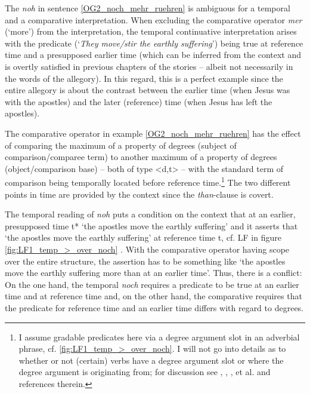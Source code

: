 \documentclass[output=paper,
modfonts
]{langscibook}
\begin{document}
The \textit{noh} in sentence \ref{OG2_noch_mehr_ruehren} is ambiguous for a temporal and a comparative interpretation. When excluding the comparative operator \textit{mer} (`more') from the interpretation, the temporal continuative interpretation arises with the predicate (`\textit{They move/stir the earthly suffering}') being true at reference time and a presupposed earlier time (which can be inferred from the context and is overtly satisfied in previous chapters of the stories -- albeit not necessarily in the words of the allegory). In this regard, this is a perfect example since the entire allegory is about the contrast between the earlier time (when Jesus was with the apostles) and the later (reference) time (when Jesus has left the apostles). 

The comparative operator in example \ref{OG2_noch_mehr_ruehren} has the effect of comparing the maximum of a property of degrees (subject of comparison/comparee term) to another maximum of a property of degrees (object/comparison base) -- both of type <d,t> -- with the standard term of comparison being temporally located before reference time.\footnote{ I assume gradable predicates here via a degree argument slot in an adverbial phrase, cf. \ref{fig:LF1_temp_>_over_noch}. I will not go into details as to whether or not (certain) verbs have a degree argument slot or where the degree argument is originating from; for discussion see \citeauthor{pinon2008} \citeyearpar{pinon2008}, \citeauthor{rett2013} \citeyearpar{rett2013}, \citeauthor{kennedy_mcnally2005} \citeyearpar{kennedy_mcnally2005}, \citeauthor{kennedy2012} \citeyearpar{kennedy2012} et al. and references therein.} The two different points in time are provided by the context since the \textit{than}-clause is covert.

The temporal reading of \textit{noh} puts a condition on the context that at an earlier, presupposed time t* `the apostles move the earthly suffering' and it asserts that `the apostles move the earthly suffering' at reference time t, cf. LF in figure \ref{fig:LF1_temp_>_over_noch} \citep[cf. also][]{beck2016a_sub}. With the comparative operator having scope over the entire structure, the assertion has to be something like `the apostles move the earthly suffering more than at an earlier time'. Thus, there is a conflict: On the one hand, the temporal \textit{noch} requires a predicate to be true at an earlier time and at reference time and, on the other hand, the comparative requires that the predicate for reference time and an earlier time differs with regard to degrees.
\end{document}

